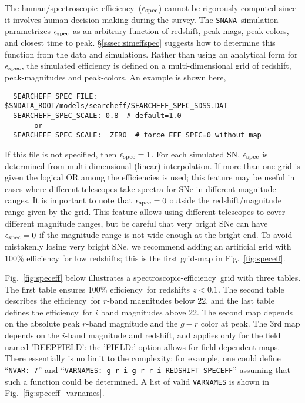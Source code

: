 \documentclass[12pt]{article}
\newcommand{\snana}{{\tt SNANA}}
\newcommand{\eff}{efficiency}
\newcommand{\simeffspec}{\epsilon_{\rm spec}}
\newcommand{\spec}{spectroscopic}
\begin{document}
{The human/\spec\ \eff\ ($\simeffspec$) cannot be rigorously computed
since it involves human decision making during the survey.
The \snana\ simulation parametrizes $\simeffspec$ as an arbitrary
function of redshift, peak-mags, peak colors, and closest time to peak.
\S\ref{sssec:simeffspec} suggests how to determine
this function from the data and simulations.
Rather than using an analytical form for $\simeffspec$,
the simulated efficiency is defined on a multi-dimensional
grid of redshift, peak-magnitudes and peak-colors.
An example is shown here,
\begin{verbatim}
  SEARCHEFF_SPEC_FILE:  $SNDATA_ROOT/models/searcheff/SEARCHEFF_SPEC_SDSS.DAT
  SEARCHEFF_SPEC_SCALE: 0.8  # default=1.0
       or
  SEARCHEFF_SPEC_SCALE:  ZERO  # force EFF_SPEC=0 without map
\end{verbatim}
If this file is not specified, then $\simeffspec=1$.
For each simulated SN, $\simeffspec$ is determined from 
multi-dimensional (linear) interpolation. 
If more than one grid is given 
the logical OR among the efficiencies is used;
this feature may be useful in cases where different telescopes
take spectra for SNe in different magnitude ranges.
It is important to note that $\simeffspec=0$ outside
the redshift/magnitude range given by the grid.
This feature allows using different telescopes to cover
different magnitude ranges, but be careful that very bright
SNe can have $\simeffspec=0$ if the magnitude range is not
wide enough at the bright end. To avoid mistakenly losing 
very bright SNe, we recommend adding an artificial 
grid with 100\% efficiency for low redshifts;
this is the first grid-map in Fig.~\ref{fig:speceff}.


Fig.~\ref{fig:speceff} below illustrates a
\spec-\eff\ grid with three tables.
The first table ensures 100\% \eff\ for redshifts $z<0.1$.
The second table describes the \eff\ for $r$-band magnitudes 
below 22, and the last table defines the \eff\ for
$i$ band magnitudes above 22. 
The second map depends on the absolute peak $r$-band magnitude
and the $g-r$ color at peak.
The 3rd map depends on the $i$-band magnitude and redshift,
and applies only for the field named 'DEEPFIELD':
the 'FIELD:' option allows for field-dependent maps.
There essentially is no limit to the complexity: 
for example, one could define ``{\tt NVAR: 7}'' 
and ``{\tt VARNAMES: g  r  i  g-r  r-i  REDSHIFT SPECEFF}''
assuming that such a function could be determined.
A list of valid {\tt VARNAMES} is shown in 
Fig.~\ref{fig:speceff_varnames}.

}
\end{document}

